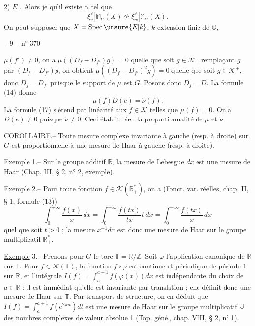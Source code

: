 2) $E$ .
Alors je  qu'il existe $\alpha$ tel que
\[
\xi_v^{\mathbb Z}|\mathbb M_\alpha(X)\not\simeq\xi_w^{\mathbb Z}|\mathbb M_\alpha(X).
\]
On peut supposer que $X=\operatorname{Spec}\unsure{E|k}$, $k$ extension
finie de $\mathbb Q$, 

-- 9 -- \hfill n° 370

$\mu(f')\ne0$, on a $\mu((D_f-D_{f'})g)=0$ quelle que soit $g\in\mathcal K$ ; remplaçant $g$ par
$(D_f-D_{f'})g$, on obtient $\mu((D_f-D_{f'})^2g)=0$ quelle que soit $g\in\mathcal K^+$, donc
$D_f=D_{f'}$ puisque le support de $\mu$ est $G$. Posons donc $D_f=D$. La formule (14)
donne
\[
\tag{17} \mu(f)D(e)=\check\nu(f).
\]
La formule (17) s'étend par linéarité aux $f\in\mathcal K$ telles que $\mu(f)=0$. On a
$D(e)\ne0$ puisque $\check\nu\ne0$. Ceci établit bien la proportionnalité de $\mu$ et $\check\nu$.

COROLLAIRE.-- \uline{Toute mesure complexe invariante à gauche} (resp. \uline{à droite}) \uline{sur} $G$
\uline{est proportionnelle à une mesure de Haar à gauche} (resp. \uline{à droite}).

\uline{Exemple} 1.-- Sur le groupe additif $\mathbb R$, la mesure de Lebesgue $dx$ est une mesure
de Haar (Chap. III, § 2, n° 2, exemple).

\uline{Exemple} 2.-- Pour toute fonction $f\in\mathcal K(\mathbb R_+^*)$, on a (Fonct. var. réelles, chap.
II, § 1, formule (13))
\[
\int_0^{+\infty}\frac{f(x)}x\,dx
=\int_0^{+\infty}\frac{f(tx)}{tx}\,t\,dx
=\int_0^{+\infty}\frac{f(tx)}x\,dx
\]
quel que soit $t>0$ ; la mesure $x^{-1}dx$ est donc une mesure de Haar sur le groupe
multiplicatif $\mathbb R_+^*$.

\uline{Exemple} 3.-- Prenons pour $G$ le tore $\mathbb T=\mathbb R/\mathbb Z$. Soit $\varphi$ l'application canonique
de $\mathbb R$ sur $\mathbb T$. Pour $f\in\mathcal K(\mathbb T)$, la fonction $f\circ\varphi$ est continue et périodique de
période 1 sur $\mathbb R$, et l'intégrale $I(f)=\int_a^{a+1}f(\varphi(x))dx$ est indépendante du
choix de $a\in\mathbb R$ ; il est immédiat qu'elle est invariante par translation ; elle
définit donc une mesure de Haar sur $\mathbb T$. Par transport de structure, on en
déduit que $I(f)=\int_a^{a+1}f(e^{2\pi it})dt$ est une mesure de Haar sur le groupe multiplicatif
$\mathbb U$ des nombres complexes de valeur absolue 1 (Top. géné., chap. VIII,
§ 2, n° 1).

